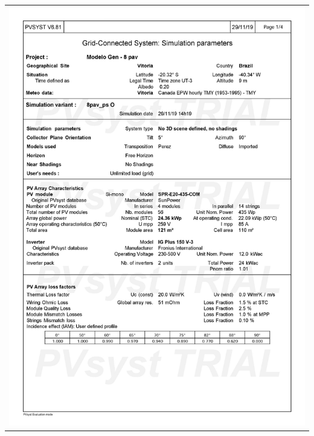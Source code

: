\begin{table}[H]
    \centering
    \begin{tabular}{l}
        \includegraphics[width=\textwidth]{figures/attachments/resultpv19.jpg}
    \end{tabular}
\end{table}
\pagebreak
